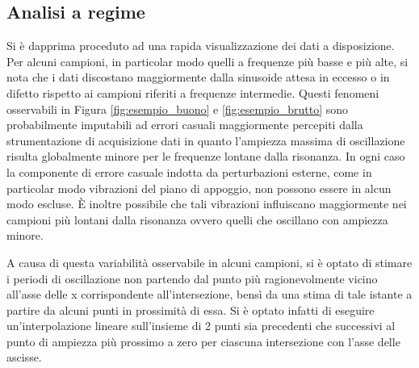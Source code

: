 \documentclass[a4paper,11pt,oneside]{article}
\begin{document}
\subsection{Analisi a regime}
Si è dapprima proceduto ad una rapida visualizzazione dei dati a disposizione.
Per alcuni campioni, in particolar modo quelli a frequenze più basse e più alte, si nota che i dati discostano maggiormente dalla sinusoide attesa in eccesso o in difetto rispetto ai campioni riferiti a frequenze intermedie.
Questi fenomeni osservabili in Figura \ref{fig:esempio_buono} e \ref{fig:esempio_brutto} sono probabilmente imputabili ad errori casuali maggiormente percepiti dalla strumentazione di acquisizione dati in quanto l'ampiezza massima di oscillazione risulta globalmente minore per le frequenze lontane dalla risonanza.
In ogni caso la componente di errore casuale indotta da perturbazioni esterne, come in particolar modo vibrazioni del piano di appoggio, non possono essere in alcun modo escluse. È inoltre possibile che tali vibrazioni influiscano maggiormente nei campioni più lontani dalla risonanza ovvero quelli che oscillano con ampiezza minore.



\begin{figure}[h!]
    \centering
    \caption*{}
\end{figure}


A causa di questa variabilità osservabile in alcuni campioni, si è optato di stimare i periodi di oscillazione non partendo dal punto più ragionevolmente vicino all'asse delle x corrispondente all'intersezione, bensì da una stima di tale istante a partire da alcuni punti in prossimità di essa. Si è optato infatti di eseguire un'interpolazione lineare sull'insieme di 2 punti sia precedenti che successivi al punto di ampiezza più prossimo a zero per ciascuna intersezione con l'asse delle ascisse.

\end{document}
